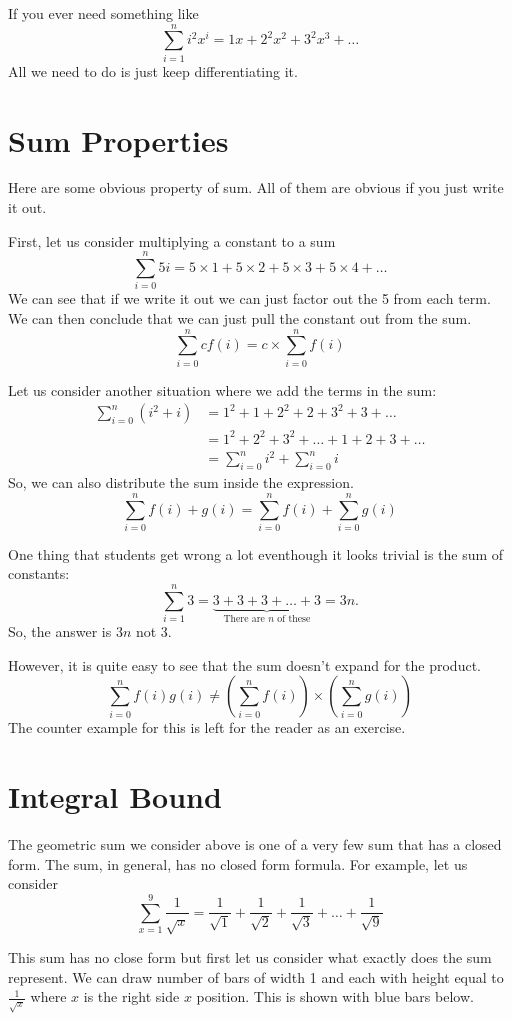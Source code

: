 \documentclass[a4paper, 12pt]{article}
\newcommand{\sumn}{\sum^n_{i=0}}
\begin{document}
If you ever need something like
\[
	\sum^{n}_{i=1} i^2x^i = 1x + 2^2x^2 + 3^2x^3 + \ldots
\]
All we need to do is just keep differentiating it. 
\begin{multicols}{2}
\section*{Sum Properties}
Here are some obvious property of sum. All of them are obvious if you just write it out.

First, let us consider multiplying a constant to a sum
\[
    \sum_{i=0}^n 5 i  = 5\times 1 + 5\times 2 + 5\times 3 + 5\times 4 + \ldots
\]
We can see that if we write it out we can just factor out the 5 from each term. We can then conclude that we can just pull the constant out from the sum.
\[
    \sum_{i=0}^n c f(i) = c \times  \sum_{i=0}^n f(i)
\]

Let us consider another situation where we add the terms in the sum:
\begin{align*}
    \sumn \left(i^2 + i\right) &= 1^2 + 1 + 2^2 + 2 + 3^2 + 3 + \ldots\\
    &= 1^2 + 2^2 + 3^2 + \ldots + 1 + 2 + 3 + \ldots\\
    &= \sumn i^2 + \sumn i
\end{align*}
So, we can also distribute the sum inside the expression.
\[
    \sumn f(i) + g(i) = \sumn f(i) + \sumn g(i)
\]

One thing that students get wrong a lot eventhough it looks trivial is the sum of constants:
\[
	\sum_{i=1}^n 3 = \underbrace{3 + 3 + 3 + \ldots + 3}_{\text{There are $n$ of these}} = 3n.
\]
So, the answer is $3n$ not 3.

However, it is quite easy to see that the sum doesn't expand for the product.
\[
    \sumn f(i)g(i) \ne \left(\sumn f(i)\right) \times \left(\sumn g(i)\right)
\]
The counter example for this is left for the reader as an exercise.

\section*{Integral Bound}
The geometric sum we consider above is one of a very few sum that has a closed form. The sum, in general, has no closed form formula. For example, let us consider
\[
    \sum_{x=1}^{9} \frac{1}{\sqrt{x}} = \frac{1}{\sqrt{1}} + \frac{1}{\sqrt{2}} + \frac{1}{\sqrt{3}}+ \ldots+ \frac{1}{\sqrt{9}} 
\]

This sum has no close form but first let us consider what exactly does the sum represent. We can draw number of bars of width 1 and each with height equal to $\frac{1}{\sqrt{x}}$ where $x$ is the right side $x$ position. This is shown with blue bars below.


\end{multicols}
\end{document}
